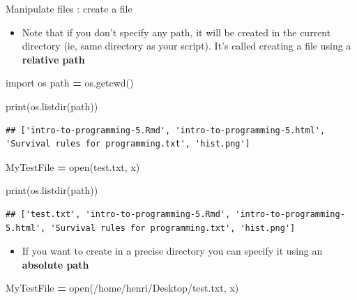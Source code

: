 \documentclass[
  8pt,
  ignorenonframetext,
]{beamer}
\newenvironment{Shaded}{\begin{snugshade}}{\end{snugshade}}
\newcommand{\BuiltInTok}[1]{#1}
\newcommand{\ImportTok}[1]{#1}
\newcommand{\NormalTok}[1]{#1}
\newcommand{\OperatorTok}[1]{\textcolor[rgb]{0.81,0.36,0.00}{\textbf{#1}}}
\newcommand{\StringTok}[1]{\textcolor[rgb]{0.31,0.60,0.02}{#1}}
\providecommand{\tightlist}{%
  \setlength{\itemsep}{0pt}\setlength{\parskip}{0pt}}
\begin{document}
\begin{frame}[fragile]{Manipulate files : create a file}
\protect\hypertarget{manipulate-files-create-a-file}{}
\begin{itemize}
\tightlist
\item
  Note that if you don't specify any path, it will be created in the
  current directory (ie, same directory as your script). It's called
  creating a file using a \textbf{relative path}
\end{itemize}

\begin{Shaded}
\begin{Highlighting}[]
\ImportTok{import}\NormalTok{ os}
\NormalTok{path }\OperatorTok{=}\NormalTok{ os.getcwd()}

\BuiltInTok{print}\NormalTok{(os.listdir(path))}
\end{Highlighting}
\end{Shaded}

\begin{verbatim}
## ['intro-to-programming-5.Rmd', 'intro-to-programming-5.html', 'Survival rules for programming.txt', 'hist.png']
\end{verbatim}

\begin{Shaded}
\begin{Highlighting}[]
\NormalTok{MyTestFile }\OperatorTok{=} \BuiltInTok{open}\NormalTok{(}\StringTok{\textquotesingle{}test.txt\textquotesingle{}}\NormalTok{, }\StringTok{\textquotesingle{}x\textquotesingle{}}\NormalTok{)}

\BuiltInTok{print}\NormalTok{(os.listdir(path))}
\end{Highlighting}
\end{Shaded}

\begin{verbatim}
## ['test.txt', 'intro-to-programming-5.Rmd', 'intro-to-programming-5.html', 'Survival rules for programming.txt', 'hist.png']
\end{verbatim}

\begin{itemize}
\tightlist
\item
  If you want to create in a precise directory you can specify it using
  an \textbf{absolute path}
\end{itemize}

\begin{Shaded}
\begin{Highlighting}[]
\NormalTok{MyTestFile }\OperatorTok{=} \BuiltInTok{open}\NormalTok{(}\StringTok{\textquotesingle{}/home/henri/Desktop/test.txt\textquotesingle{}}\NormalTok{, }\StringTok{\textquotesingle{}x\textquotesingle{}}\NormalTok{)}
\end{Highlighting}
\end{Shaded}
\end{frame}
\end{document}

